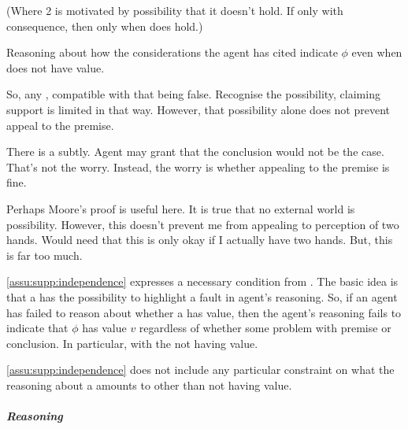 \begin{note}
  {
    \color{red}
    (Where 2 is motivated by possibility that it doesn't hold. If only with consequence, then only when does hold.)
  }

    Reasoning about how the considerations the agent has cited indicate \(\phi\) even when \requ{} does not have value.

    So, any \requ{}, compatible with that being false.
    Recognise the possibility, claiming support is limited in that way.
    However, that possibility alone does not prevent appeal to the premise.

    There is a subtly.
    Agent may grant that the conclusion would not be the case.
    That's not the worry.
    Instead, the worry is whether appealing to the premise is fine.

    Perhaps Moore's proof is useful here.
    It is true that no external world is possibility.
    However, this doesn't prevent me from appealing to perception of two hands.
    Would need that this is only okay if I actually have two hands.
    But, this is far too much.

  \autoref{assu:supp:independence} expresses a necessary condition from \ideaCS{}.
  The basic idea is that a \requ{} has the possibility to highlight a fault in agent's reasoning.
  So, if an agent has failed to reason about whether a \requ{} has {\color{red} value}, then the agent's reasoning fails to indicate that \(\phi\) has value \(v\) regardless of whether {\color{red} some problem with premise or conclusion}.
  {\color{red} In particular, with the \requ{} not having value.}

  \autoref{assu:supp:independence} does not include any particular constraint on what the reasoning about a \requ{} amounts to {\color{red} other than \requ{} not having value.}
\end{note}

\subparagraph{Reasoning}

